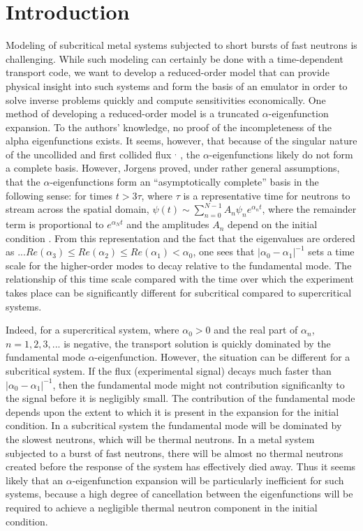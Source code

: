 \documentclass[12pt]{article}
\begin{document}
\section{Introduction}
Modeling of subcritical metal systems subjected to short bursts of fast 
	neutrons is challenging. 
While such modeling can certainly be done with a time-dependent transport code, 
	we want to develop a reduced-order model that can provide physical insight 
	into such systems and form the basis of an emulator in order to solve inverse 
	problems quickly and compute sensitivities economically. 
One method of developing a reduced-order model is a truncated
	$\alpha$-eigenfunction expansion. 
To the authors' knowledge, no proof of the incompleteness of the alpha 
	eigenfunctions exists. 
It seems, however, that because of the singular nature of the uncollided and    
	first collided flux \cite{bondarenko1996}$^,$\cite{larsen1975} , the $\alpha$-eigenfunctions likely do not form a 
	complete basis. 
However, Jorgens proved, under rather general assumptions, that the 
	$\alpha$-eigenfunctions form an ``asymptotically complete'' basis in the 
	following sense: for times $t>3\tau$, where $\tau$ is a representative time 
	for neutrons to stream across the spatial domain, $\psi\left(t\right) \sim 
	\sum_{n=0}^{N-1} A_n \psi_n e^{\alpha_n t}$, where the remainder term is 
	proportional to $e^{\alpha_N t}$ and the amplitudes $A_n$ depend on the 
	initial condition \cite{jorgens1958} . 
From this representation and the fact that the eigenvalues are ordered as 
	$...Re\left(\alpha_3\right)\le Re\left(\alpha_2\right)\le  Re\left(\alpha_1\right) < \alpha_0$, one sees that 
	$|\alpha_0 - \alpha_1|^{-1}$ sets a time scale for the higher-order modes to 
	decay relative to the fundamental mode. 
The relationship of this time scale compared with the time over which the 
	experiment takes place can be significantly different for subcritical 
	compared to supercritical systems.  

Indeed, for a supercritical system, where $\alpha_0 > 0$ and the real part of 
	$\alpha_n$, $n=1,2,3,...$ is negative, the transport solution is quickly 
	dominated by the fundamental mode $\alpha$-eigenfunction.
However, the situation can be different for a subcritical system. 
If the flux (experimental signal) decays much faster than $|\alpha_0 - 
	\alpha_1|^{-1}$, then the fundamental mode might not contribution 
	significanlty to the signal before it is negligibly small. 
The contribution of the fundamental mode depends upon the extent to which it is 
	present in the expansion for the initial condition. 
In a subcritical system the fundamental mode will be dominated by the slowest 
	neutrons, which will be thermal neutrons. 
In a metal system subjected to a burst of fast neutrons, there will be almost 
	no thermal neutrons created before the response of the system has effectively 
	died away.  
Thus it seems likely that an $\alpha$-eigenfunction expansion will be 
	particularly inefficient for such systems, because a high degree of 
	cancellation between the eigenfunctions will be required to achieve a 
	negligible thermal neutron component in the initial condition.  
\end{document}
